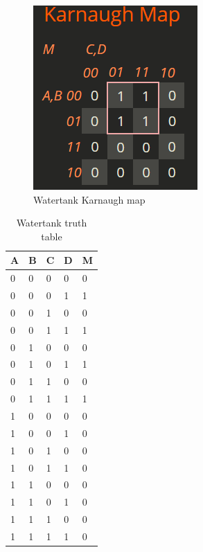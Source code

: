 \documentclass{article}
\begin{document}
\begin{multicols}{2}
	\begin{figure}[H]
		\centering
		\includegraphics[width=0.6\linewidth]{images/k-maps/watertank.png}
		\caption{Watertank Karnaugh map}
		\label{Watertank Karnaugh map solution Apendix}
	\end{figure}

	\begin{table}[H]
		\centering
		\caption{Watertank truth table}
		\vspace*{1em}
		\begin{tabular}{|l|l|l|l|l|}
			\hline
			A & B & C & D & M \\ \hline
			0 & 0 & 0 & 0 & 0 \\ \hline
			0 & 0 & 0 & 1 & 1 \\ \hline
			0 & 0 & 1 & 0 & 0 \\ \hline
			0 & 0 & 1 & 1 & 1 \\ \hline
			0 & 1 & 0 & 0 & 0 \\ \hline
			0 & 1 & 0 & 1 & 1 \\ \hline
			0 & 1 & 1 & 0 & 0 \\ \hline
			0 & 1 & 1 & 1 & 1 \\ \hline
			1 & 0 & 0 & 0 & 0 \\ \hline
			1 & 0 & 0 & 1 & 0 \\ \hline
			1 & 0 & 1 & 0 & 0 \\ \hline
			1 & 0 & 1 & 1 & 0 \\ \hline
			1 & 1 & 0 & 0 & 0 \\ \hline
			1 & 1 & 0 & 1 & 0 \\ \hline
			1 & 1 & 1 & 0 & 0 \\ \hline
			1 & 1 & 1 & 1 & 0 \\ \hline
		\end{tabular}
	\end{table}



\end{multicols}
\end{document}
